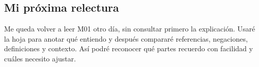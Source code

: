 \subsection{Mi próxima relectura}
Me queda volver a leer M01 otro día, sin consultar primero la explicación.
Usaré la hoja  para anotar qué entiendo y después compararé
referencias, negaciones, definiciones y contexto. Así podré reconocer qué partes
recuerdo con facilidad y cuáles necesito ajustar.
